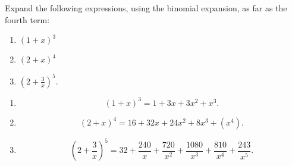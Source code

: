 Expand the following expressions, using the binomial expansion, as far as the fourth term:
\begin{enumerate}
\item $(1+x)^3$
\item $(2+x)^4$
\item $\left(2 + \frac{3}{x}\right)^5$.
\end{enumerate}
\begin{enumerate}
\item
\[
(1+x)^3 = 1 + 3x + 3x^2 + x^3.
\]
\item
\[
(2+x)^4 = 16 + 32x + 24x^2 + 8x^3 + (x^4).
\]
\item
\[
\left(2+ \frac{3}{x}\right)^5 = 32 + \frac{240}{x} + \frac{720}{x^2} + \frac{1080}{x^3} + \frac{810}{x^4} + \frac{243}{x^5}.
\]
\end{enumerate}